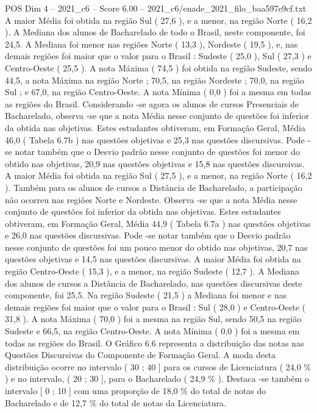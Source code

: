 \begin{textsample}{POS Dim 4 – 2021\_c6 – Score 6.00 – 2021\_c6/enade\_2021\_filo\_baa597e9cf.txt}
A maior Média foi obtida na região Sul ( 27,6 ), e a menor, na região Norte ( 16,2 ).
A Mediana dos alunos de Bacharelado de todo o Brasil, neste componente, foi 24,5.
A Mediana foi menor nas regiões Norte ( 13,3 ), Nordeste ( 19,5 ), e, nas demais regiões foi maior que o valor para o Brasil : Sudeste ( 25,0 ), Sul ( 27,3 ) e Centro-Oeste ( 25,5 ).
A nota Máxima ( 74,5 ) foi obtida na região Sudeste, sendo 44,5, a nota Máxima na região Norte ; 70,5, na região Nordeste ; 70,0, na região Sul ; e 67,0, na região Centro-Oeste.
A nota Mínima ( 0,0 ) foi a mesma em todas as regiões do Brasil.
Considerando -se agora os alunos de cursos Presenciais de Bacharelado, observa -se que a nota Média nesse conjunto de questões foi inferior da obtida nas objetivas.
Estes estudantes obtiveram, em Formação Geral, Média 46,0 ( Tabela 6.7b ) nas questões objetivas e 25,3 nas questões discursivas.
Pode -se notar também que o Desvio padrão nesse conjunto de questões foi menor do obtido nas objetivas, 20,9 nas questões objetivas e 15,8 nas questões discursivas.
A maior Média foi obtida na região Sul ( 27,5 ), e a menor, na região Norte ( 16,2 ).
Também para os alunos de cursos a Distância de Bacharelado, a participação não ocorreu nas regiões Norte e Nordeste.
Observa -se que a nota Média nesse conjunto de questões foi inferior da obtida nas objetivas.
Estes estudantes obtiveram, em Formação Geral, Média 44,9 ( Tabela 6.7a ) nas questões objetivas e 26,0 nas questões discursivas.
Pode -se notar também que o Desvio padrão nesse conjunto de questões foi um pouco menor do obtido nas objetivas, 20,7 nas questões objetivas e 14,5 nas questões discursivas.
A maior Média foi obtida na região Centro-Oeste ( 15,3 ), e a menor, na região Sudeste ( 12,7 ).
A Mediana dos alunos de cursos a Distância de Bacharelado, nas questões discursivas deste componente, foi 25,5.
Na região Sudeste ( 21,5 ) a Mediana foi menor e nas demais regiões foi maior que o valor para o Brasil : Sul ( 28,0 ) e Centro-Oeste ( 31,8 ).
A nota Máxima ( 70,0 ) foi a mesma na região Sul, sendo 50,5 na região Sudeste e 66,5, na região Centro-Oeste.
A nota Mínima ( 0,0 ) foi a mesma em todas as regiões do Brasil.
O Gráfico 6.6 representa a distribuição das notas nas Questões Discursivas do Componente de Formação Geral.
A moda desta distribuição ocorre no intervalo ( 30 ; 40 ] para os cursos de Licenciatura ( 24,0 \% ) e no intervalo, ( 20 ; 30 ], para o Bacharelado ( 24,9 \% ).
Destaca -se também o intervalo [ 0 ; 10 ] com uma proporção de 18,0 \% do total de notas do Bacharelado e de 12,7 \% do total de notas da Licenciatura.

\end{textsample}
